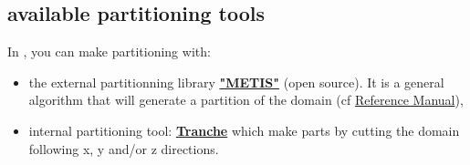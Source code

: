 \subsection{\trust available partitioning tools} \label{partitioner}
In \trust, you can make partitioning with:
\begin{itemize}
\item the external partitionning library \href{http://glaros.dtc.umn.edu/gkhome/views/metis}{\textbf{"METIS"}} (open source). It is a general algorithm that will generate a partition of the domain (cf \href{\REFERENCEMANUAL\#partitionneurmetis}{\trustref Reference Manual}),
\begin{center}
\end{center}

\item internal \trust partitioning tool: \href{\REFERENCEMANUAL\#partitionneurtranche}{\textbf{Tranche}} which make parts by cutting the domain following x, y and/or z directions.
    \begin{center}
    \end{center}



\end{itemize}
